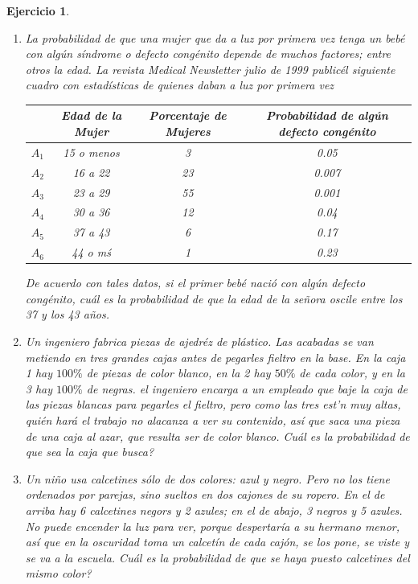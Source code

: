 \documentclass[12pt,twoside]{article}
\newtheorem{Ejer}{Ejercicio}
\begin{document}
\begin{Ejer}
\begin{enumerate}
\item La probabilidad de que una mujer que da a luz por primera vez tenga un beb\'e con alg\'un s\'indrome o defecto cong\'enito depende de muchos factores; entre otros la edad.  La revista { \em Medical Newsletter} julio de 1999 public\' el siguiente cuadro con estad\'isticas de quienes daban a luz por primera vez

\begin{table}[!ht]
\begin{center}
\begin{tabular}{|c|c|c|c|}
\hline
 & Edad de la Mujer  & Porcentaje de Mujeres & Probabilidad de alg\'un defecto cong\'enito \\\hline
$A_{1}$ & 15 o menos & 3 & 0.05 \\\hline
$A_{2}$ & 16 a 22 & 23 & 0.007 \\\hline
$A_{3}$ & 23 a 29 & 55 & 0.001 \\\hline
$A_{4}$ & 30 a 36 & 12 & 0.04 \\\hline
$A_{5}$ & 37 a 43 & 6 & 0.17 \\\hline
$A_{6}$ & 44 o m\'s & 1 & 0.23 \\\hline
\end{tabular}
\end{center}
\end{table}

De acuerdo con tales datos, si el primer beb\'e naci\'o con alg\'un defecto cong\'enito, cu\'al es la probabilidad de que la edad de la se\~nora oscile entre los 37 y los 43 a\~nos.

\item Un ingeniero fabrica piezas de ajedr\'ez de pl\'astico. Las acabadas se van metiendo en tres grandes cajas antes de pegarles fieltro en la base. En la caja 1 hay $100\%$ de piezas de color blanco, en la 2 hay $50\%$ de cada color, y en la 3 hay $100\%$ de negras. el ingeniero encarga a un empleado que baje la caja de las piezas blancas para pegarles el fieltro, pero como las tres est\a'n muy altas, qui\'en har\'a el trabajo no alacanza a ver su contenido, as\'i que saca una pieza de una caja al azar, que resulta ser de color blanco. Cu\'al es la probabilidad de que sea la caja que busca?


\item Un ni\~no usa calcetines s\'olo de dos colores: azul y negro. Pero no los tiene ordenados por parejas, sino sueltos en dos cajones de su ropero. En el de arriba hay 6 calcetines negors y 2 azules; en el de abajo, 3 negros y 5 azules. No puede encender la luz para ver, porque despertar\'ia a su hermano menor, as\'i que en la oscuridad toma un calcet\'in de cada caj\'on, se los pone, se viste y se va a la escuela.  Cu\'al es la probabilidad de que se haya puesto calcetines del mismo color?


\end{enumerate}
\end{Ejer}
\end{document}
